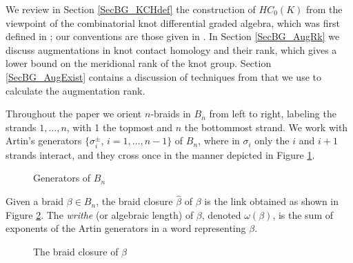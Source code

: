 \documentclass[11pt]{amsart}
\def\s{{\sigma}}
\theoremstyle{definition}
\begin{document}
  We review in Section \ref{SecBG_KCHdef} the construction of $HC_0(K)$ from the viewpoint of the combinatorial knot differential graded algebra, which was first defined in \cite{Ng08}; our conventions are those given in \cite{Ng12}. In Section \ref{SecBG_AugRk} we discuss augmentations in knot contact homology and their rank, which gives a lower bound on the meridional rank of the knot group. Section \ref{SecBG_AugExist} contains a discussion of techniques from \cite{Cor13a} that we use to calculate the augmentation rank.

  Throughout the paper we orient $n$-braids in $B_n$ from left to right, labeling the strands $1,\ldots, n$, with 1 the topmost and $n$ the bottommost strand. We work with Artin's generators $\{\sigma_i^{\pm}$, $i=1,\ldots,n-1\}$ of $B_n$, where in $\s_i$ only the $i$ and $i+1$ strands interact, and they cross once in the manner depicted in Figure \ref{fig:BraidGens}.
      \begin{figure}[ht]
        \caption{Generators of $B_n$}
        \label{fig:BraidGens}
      \end{figure}
    Given a braid $\beta\in B_n$, the braid closure $\hat{\beta}$ of $\beta$ is the link obtained as shown in Figure \ref{fig:BClosure}. The \emph{writhe} (or algebraic length) of $\beta$, denoted $\omega(\beta)$, is the sum of exponents of the Artin generators in a word representing $\beta$.

    \begin{figure}[ht]
      \caption{The braid closure of $\beta$}
      \label{fig:BClosure}
    \end{figure}
\end{document}
